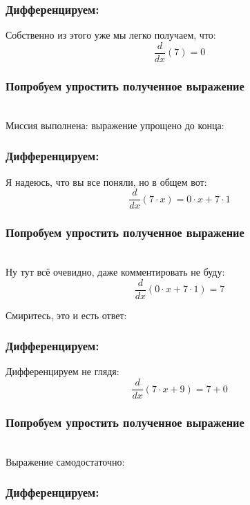 \documentclass[a4paper,12pt]{article}
\begin{document}
\subsubsection*{Дифференцируем:}

Собственно из этого уже мы легко получаем, что:
\begin{dmath}\frac{d}{dx}\left(7\right)=0\end{dmath}
\subsubsection*{Попробуем упростить полученное выражение}
\\Миссия выполнена: выражение упрощено до конца:

\subsubsection*{Дифференцируем:}

Я надеюсь, что вы все поняли, но в общем вот:
\begin{dmath}\frac{d}{dx}\left(7\cdot x\right)=0\cdot x+ 7\cdot 1\end{dmath}
\subsubsection*{Попробуем упростить полученное выражение}
\\Ну тут всё очевидно, даже комментировать не буду:\\
\begin{dmath}
	\frac{d}{dx}\left(0\cdot x+ 7\cdot 1\right) = 7\end{dmath}

Смиритесь, это и есть ответ:

\subsubsection*{Дифференцируем:}

Дифференцируем не глядя:
\begin{dmath}\frac{d}{dx}\left(7\cdot x+ 9\right)=7+ 0\end{dmath}
\subsubsection*{Попробуем упростить полученное выражение}
\\Выражение самодостаточно:

\subsubsection*{Дифференцируем:}
\end{document}
